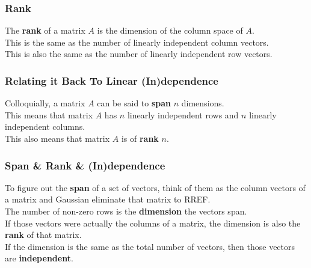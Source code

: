 \documentclass{beamer}
\begin{document}
\begin{frame}[t]\vspace{10pt}
\frametitle{Rank}
The \textbf{rank} of a matrix $A$ is the dimension of the column space of $A$. \\
This is the same as the number of linearly independent column vectors. \\
This is also the same as the number of linearly independent row vectors.
\end{frame}

\begin{frame}[t]\vspace{10pt}
\frametitle{Relating it Back To Linear (In)dependence}
Colloquially, a matrix $A$ can be said to \textbf{span} $n$ dimensions. \\
This means that matrix $A$ has $n$ linearly independent rows and $n$ linearly independent columns. \\
This also means that matrix $A$ is of \textbf{rank} $n$.
\end{frame}

\begin{frame}[t]\vspace{10pt}
\frametitle{Span \& Rank \& (In)dependence}
To figure out the \textbf{span} of a set of vectors, think of them as the column vectors of a matrix and Gaussian eliminate that matrix to RREF. \\
The number of non-zero rows is the \textbf{dimension} the vectors span. \\
If those vectors were actually the columns of a matrix, the dimension is also the \textbf{rank} of that matrix. \\
If the dimension is the same as the total number of vectors, then those vectors are \textbf{independent}.
\end{frame}
\end{document}
